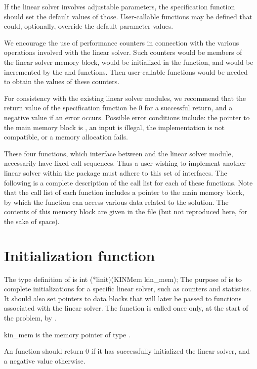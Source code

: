 If the linear solver involves adjustable parameters, the specification
function should set the default values of those.  User-callable
functions may be defined that could, optionally, override the default
parameter values.

We encourage the use of performance counters in connection with the various
operations involved with the linear solver.  Such counters would be
members of the linear solver memory block, would be initialized in the
 function, and would be incremented by the  and
 functions.  Then user-callable functions would be needed to
obtain the values of these counters.

For consistency with the existing {\kinsol} linear solver modules, we
recommend that the return value of the specification function be 0 for
a successful return, and a negative value if an error occurs.
Possible error conditions include: the pointer to the main {\kinsol}
memory block is , an input is illegal, the {\nvector}
implementation is not compatible, or a memory allocation fails.

\vspace{0.1in}
These four functions, which interface between {\kinsol} and the linear solver module,
necessarily have fixed call sequences.  Thus a user wishing to implement another 
linear solver within the {\kinsol} package must adhere to this set of interfaces.
The following is a complete description of the call list for each of
these functions.  Note that the call list of each function includes a
pointer to the main {\kinsol} memory block, by which the function can access
various data related to the {\kinsol} solution.  The contents of this memory
block are given in the file  (but not reproduced here, for
the sake of space).


\section{Initialization function}
The type definition of  is
{
  int (*linit)(KINMem kin\_mem);
}
{
  The purpose of  is to complete initializations for      
  a specific linear solver, such as counters and statistics.        
  It should also set pointers to data blocks that will later be
  passed to functions associated with the linear solver.
  The  function is called once only, at the start of
  the problem, by .
}
{
  \begin{args}
  \item[kin\_mem]
    is the {\kinsol} memory pointer of type .
  \end{args}
}
{
  An  function should return 0 if it 
  has successfully initialized the {\kinsol} linear solver, and 
  a negative value otherwise. 
}
{}


